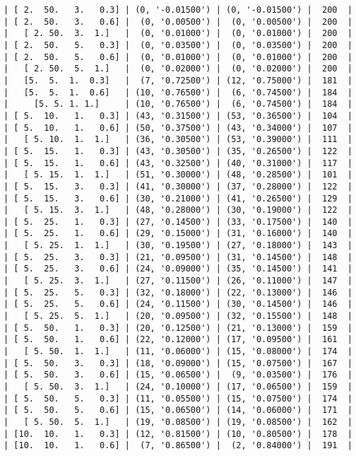\documentclass{article}
\begin{document}
\begin{verbatim}
| [ 2.  50.   3.   0.3] | (0, '-0.01500') | (0, '-0.01500') |  200  |
| [ 2.  50.   3.   0.6] |  (0, '0.00500') |  (0, '0.00500') |  200  |
|   [ 2. 50.  3.  1.]   |  (0, '0.01000') |  (0, '0.01000') |  200  |
| [ 2.  50.   5.   0.3] |  (0, '0.03500') |  (0, '0.03500') |  200  |
| [ 2.  50.   5.   0.6] |  (0, '0.01000') |  (0, '0.01000') |  200  |
|   [ 2. 50.  5.  1.]   |  (0, '0.02000') |  (0, '0.02000') |  200  |
|   [5.  5.  1.  0.3]   |  (7, '0.72500') | (12, '0.75000') |  181  |
|   [5.  5.  1.  0.6]   | (10, '0.76500') |  (6, '0.74500') |  184  |
|     [5. 5. 1. 1.]     | (10, '0.76500') |  (6, '0.74500') |  184  |
| [ 5.  10.   1.   0.3] | (43, '0.31500') | (53, '0.36500') |  104  |
| [ 5.  10.   1.   0.6] | (50, '0.37500') | (43, '0.34000') |  107  |
|   [ 5. 10.  1.  1.]   | (36, '0.30500') | (53, '0.39000') |  111  |
| [ 5.  15.   1.   0.3] | (43, '0.30500') | (35, '0.26500') |  122  |
| [ 5.  15.   1.   0.6] | (43, '0.32500') | (40, '0.31000') |  117  |
|   [ 5. 15.  1.  1.]   | (51, '0.30000') | (48, '0.28500') |  101  |
| [ 5.  15.   3.   0.3] | (41, '0.30000') | (37, '0.28000') |  122  |
| [ 5.  15.   3.   0.6] | (30, '0.21000') | (41, '0.26500') |  129  |
|   [ 5. 15.  3.  1.]   | (48, '0.28000') | (30, '0.19000') |  122  |
| [ 5.  25.   1.   0.3] | (27, '0.14500') | (33, '0.17500') |  140  |
| [ 5.  25.   1.   0.6] | (29, '0.15000') | (31, '0.16000') |  140  |
|   [ 5. 25.  1.  1.]   | (30, '0.19500') | (27, '0.18000') |  143  |
| [ 5.  25.   3.   0.3] | (21, '0.09500') | (31, '0.14500') |  148  |
| [ 5.  25.   3.   0.6] | (24, '0.09000') | (35, '0.14500') |  141  |
|   [ 5. 25.  3.  1.]   | (27, '0.11500') | (26, '0.11000') |  147  |
| [ 5.  25.   5.   0.3] | (32, '0.18000') | (22, '0.13000') |  146  |
| [ 5.  25.   5.   0.6] | (24, '0.11500') | (30, '0.14500') |  146  |
|   [ 5. 25.  5.  1.]   | (20, '0.09500') | (32, '0.15500') |  148  |
| [ 5.  50.   1.   0.3] | (20, '0.12500') | (21, '0.13000') |  159  |
| [ 5.  50.   1.   0.6] | (22, '0.12000') | (17, '0.09500') |  161  |
|   [ 5. 50.  1.  1.]   | (11, '0.06000') | (15, '0.08000') |  174  |
| [ 5.  50.   3.   0.3] | (18, '0.09000') | (15, '0.07500') |  167  |
| [ 5.  50.   3.   0.6] | (15, '0.06500') |  (9, '0.03500') |  176  |
|   [ 5. 50.  3.  1.]   | (24, '0.10000') | (17, '0.06500') |  159  |
| [ 5.  50.   5.   0.3] | (11, '0.05500') | (15, '0.07500') |  174  |
| [ 5.  50.   5.   0.6] | (15, '0.06500') | (14, '0.06000') |  171  |
|   [ 5. 50.  5.  1.]   | (19, '0.08500') | (19, '0.08500') |  162  |
| [10.  10.   1.   0.3] | (12, '0.81500') | (10, '0.80500') |  178  |
| [10.  10.   1.   0.6] |  (7, '0.86500') |  (2, '0.84000') |  191  |

\end{verbatim}
\end{document}
